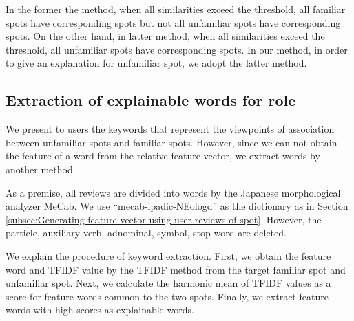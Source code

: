 \documentclass[journal]{IAENGtran}
\begin{document}
In the former the method, when all similarities exceed the threshold, all familiar spots have corresponding spots but not all unfamiliar spots have corresponding spots.
On the other hand, in latter method, when all similarities exceed the threshold, all unfamiliar spots have corresponding spots.
In our method, in order to give an explanation for unfamiliar spot, we adopt the latter method.

\subsection{Extraction of explainable words for role}
\label{subsec:Extraction of explainable words for role}
We present to users the keywords that represent the viewpoints of association between unfamiliar spots and familiar spots.
However, since we can not obtain the feature of a word from the relative feature vector, we extract words by another method.

As a premise, all reviews are divided into words by the Japanese morphological analyzer MeCab.
We use ``mecab-ipadic-NEologd'' as the dictionary as in Section \ref{subsec:Generating feature vector using user reviews of spot}.
However, the particle, auxiliary verb, adnominal, symbol, stop word are deleted.

We explain the procedure of keyword extraction.
First, we obtain the feature word and TFIDF value by the TFIDF method from the target familiar spot and unfamiliar spot.
Next, we calculate the harmonic mean of TFIDF values as a score for feature words common to the two spots.
Finally, we extract feature words with high scores as explainable words.
\end{document}
